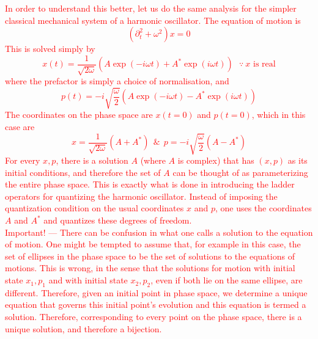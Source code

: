 \documentclass[11pt]{article}
\newcommand{\del}{\partial}
\newcommand{\w}{\omega}
\numberwithin{equation}{section}
\begin{document}
    \textcolor{red}{
        In order to understand this better, let us do the same analysis for the simpler classical mechanical system of a harmonic oscillator. The equation of motion is 
        \begin{equation*}
            ( \del_t^2 + \w^2 )x = 0
        \end{equation*} This is solved simply by 
        \begin{equation*}
            x(t) = \frac{1}{\sqrt{2\w}}\left(A\exp(-i\w t) + A^*\exp(i\w t)\right) ~~~\because~x\text{ is real}
        \end{equation*}
        where the prefactor is simply a choice of normalisation, and 
        \begin{equation*}
            p(t) = -i\sqrt{\frac{\w}{2}} (A\exp(-i\w t) - A^* \exp(i \w t))
        \end{equation*}
        The coordinates on the phase space are \(x(t=0)\) and \(p(t=0)\), which in this case are 
        \begin{equation*}
            x = \frac{1}{\sqrt{2\w}}(A + A^*)~~\&~~p = -i\sqrt{\frac{\w}{2}} (A - A^*)
        \end{equation*}
        For every \(x, p\), there is a solution \(A\) (where \(A\) is complex) that has \((x,p)\) as its initial conditions, and therefore the set of \(A\) can be thought of as parameterizing the entire phase space. This is exactly what is done in introducing the ladder operators for quantizing the harmonic oscillator. Instead of imposing the quantization condition on the usual coordinates \(x\) and \(p\), one uses the coordinates \(A\) and \(A^*\) and quantizes these degrees of freedom. \\
        Important! — There can be confusion in what one calls a solution to the equation of motion. One might be tempted to assume that, for example in this case, the set of ellipses in the phase space to be the set of solutions to the equations of motions. This is wrong, in the sense that the solutions for motion with initial state \(x_1, p_1\) and with initial state \(x_2, p_2\), even if both lie on the same ellipse, are different. Therefore, given an initial point in phase space, we determine a unique equation that governs this initial point's evolution and this equation is termed a solution. Therefore, corresponding to every point on the phase space, there is a unique solution, and therefore a bijection.  \\      
        }
\end{document}
